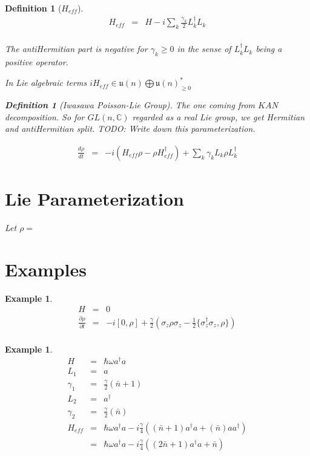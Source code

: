 \documentclass[11pt]{article}
\theoremstyle{change}
\newtheorem{definition}[equation]{Definition}
\newtheorem{example}[equation]{Example}
\theoremstyle{nonumberplain}
\numberwithin{equation}{section}
\newcommand\setof[1]{\{ #1 \}}
\begin{document}
\begin{definition}[$H_{eff}$]
\begin{eqnarray*}
H_{eff} &=& H - i \sum_k \frac{\gamma_k}{2} L_k^\dagger L_k\\
\end{eqnarray*}

The antiHermitian part is negative for $\gamma_k \geq 0$ in the sense of $L_k^\dagger L_k$ being a positive operator.

In Lie algebraic terms $i H_{eff} \in \mathfrak{u}(n) \bigoplus \mathfrak{u}(n)^*_{\geq 0}$

\begin{definition}[Iwasawa Poisson-Lie Group]
The one coming from $KAN$ decomposition. So for $GL(n,\mathbb{C})$ regarded as a real Lie group, we get Hermitian and antiHermitian split. TODO: Write down this parameterization.
\end{definition}

\begin{eqnarray*}
\frac{d\rho}{dt} &=& - i ( H_{eff} \rho - \rho H_{eff}^\dagger ) + \sum_{k} \gamma_k L_k \rho L_k^\dagger
\end{eqnarray*}

\section{Lie Parameterization}

Let $\rho = $

\end{definition}

\section{Examples}

\begin{example}
\begin{eqnarray*}
H &=& 0\\
\frac{\partial \rho}{\partial t} &=& -i [0,\rho] + \frac{\gamma}{2} ( \sigma_z \rho \sigma_z - \frac{1}{2} \setof{ \sigma_z^\dagger \sigma_z , \rho } )\\
\end{eqnarray*}
\end{example}

\begin{example}
\begin{eqnarray*}
H &=& \hbar \omega a^\dagger a\\
L_1 &=& a\\
\gamma_1 &=& \frac{\gamma}{2} (\bar{n}+1)\\
L_2 &=& a^\dagger\\
\gamma_2 &=& \frac{\gamma}{2} (\bar{n})\\
H_{eff} &=& \hbar \omega a^\dagger a - i \frac{\gamma}{4} ( (\bar{n}+1) a^\dagger a + (\bar{n}) a a^\dagger )\\
&=& \hbar \omega a^\dagger a - i \frac{\gamma}{4} ( (2 \bar{n}+1) a^\dagger a + \bar{n} )\\
\end{eqnarray*}
\end{example}
\end{document}
